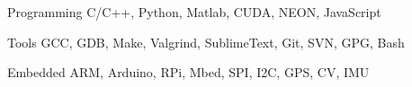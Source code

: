 

\begin{cvskills}

  \cvskill
    {Programming} %
    {C/C++, Python, Matlab, CUDA, NEON, JavaScript} %

  \cvskill
    {Tools} %
    {GCC, GDB, Make, Valgrind, SublimeText, Git, SVN, GPG, Bash} %

  \cvskill
    {Embedded} %
    {ARM, Arduino, RPi, Mbed, SPI, I2C, GPS, CV, IMU} %

\end{cvskills}

